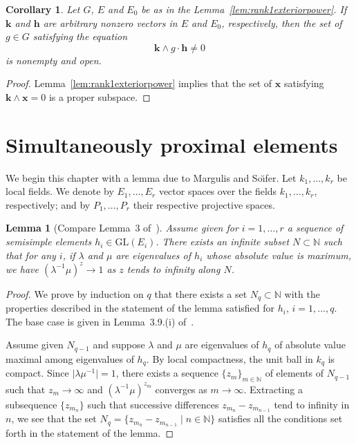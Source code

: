 \documentclass{amsart}
\theoremstyle{plain}
\newtheorem{lemma}[theorem]{Lemma}
\newtheorem{corollary}[theorem]{Corollary}
\theoremstyle{definition}
\theoremstyle{remark}
\newcommand{\Vect}[1]{\mathbold{#1}}
\providecommand{\abs}[1]{\lvert#1\rvert}
\begin{document}
\begin{corollary}\label{cor:rank1exteriorpower}
Let $G$, $E$ and $E_{0}$ be as in the Lemma~\ref{lem:rank1exteriorpower}. If $\Vect{k}$
and $\Vect{h}$
are arbitrary nonzero vectors in $E$ and $E_{0}$, respectively, then the set of $g \in G$
satisfying the equation $$\Vect{k} \wedge g \cdot \Vect{h} \neq 0$$ is nonempty and open.
\end{corollary}
\begin{proof}
Lemma~\ref{lem:rank1exteriorpower} implies that the set of $\Vect{x}$ satisfying $\Vect{k} \wedge \Vect{x} =
0$ is a proper subspace.
\end{proof}


\section{Simultaneously proximal elements}\label{sec:SimProx}
We begin this chapter with a lemma due to Margulis and So{\u\i}fer. Let $k_{1},\ldots, k_{r}$ be local fields. 
We denote by $E_{1},\ldots, E_{r}$ vector spaces over the fields $k_{1},\ldots, k_{r}$,
respectively; and by $P_{1},\ldots, P_{r}$ their respective projective spaces.

\begin{lemma}[Compare Lemma~3 of~\cite{MR613853}]\label{lem:rotationofeigs}
Assume given for $i = 1,\ldots, r$ a sequence of semisimple elements $h_{i} \in
\mathrm{GL}(E_{i})$. There exists an infinite subset $N \subset \mathbb{N}$ such
that for any $i$, if $\lambda$ and $\mu$ are eigenvalues of $h_{i}$ whose absolute value is
maximum, we have $(\lambda^{-1}\mu)^{z} \to 1$ as $z$ tends to infinity along $N$.
\end{lemma}
\begin{proof}
We prove by induction on $q$ that there exists a set $N_{q} \subset \mathbb{N}$ with the
properties described in the statement of the lemma satisfied for $h_{i}$, $i = 1,\ldots,
q$. The base case is given in Lemma~3.9.(i) of~\cite{MR44:4105}. 

Assume given $N_{q-1}$ and suppose $\lambda$ and $\mu$ are eigenvalues of $h_{q}$
of absolute value maximal among eigenvalues of $h_{q}$. By local compactness, the unit
ball in $k_{q}$ is compact. Since $\abs{\lambda\mu^{-1}} = 1$, there exists a
sequence $\{z_{m}\}_{m \in \mathbb{N}}$ of elements of $N_{q-1}$ such that $z_{m} \to
\infty$ and $(\lambda^{-1}\mu)^{z_{m}}$ converges as $m \to \infty$. Extracting a
subsequence $\{z_{m_{n}}\}$ such that successive differences $z_{m_{n}} - z_{m_{n-1}}$
tend to infinity in $n$, we see that the set $N_{q} = \{z_{m_{n}} - z_{m_{n-1}} \mid n \in 
\mathbb{N}\}$ satisfies all the conditions set forth in the statement of the lemma.
\end{proof}
\end{document}
